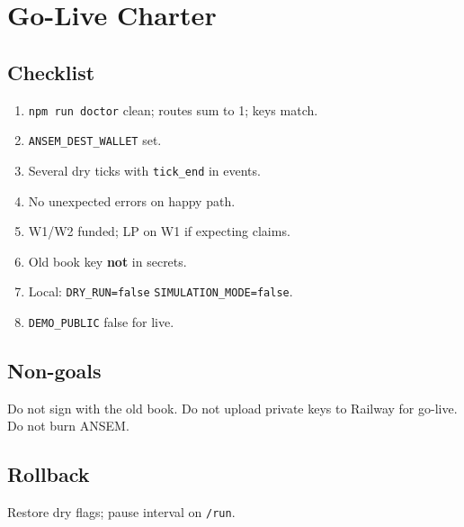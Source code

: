 \chapter{Go-Live Charter}

\section{Checklist}

\begin{enumerate}
  \item \texttt{npm run doctor} clean; routes sum to 1; keys match.
  \item \texttt{ANSEM\_DEST\_WALLET} set.
  \item Several dry ticks with \texttt{tick\_end} in events.
  \item No unexpected errors on happy path.
  \item W1/W2 funded; LP on W1 if expecting claims.
  \item Old book key \textbf{not} in secrets.
  \item Local: \texttt{DRY\_RUN=false} \texttt{SIMULATION\_MODE=false}.
  \item \texttt{DEMO\_PUBLIC} false for live.
\end{enumerate}

\section{Non-goals}

Do not sign with the old book. Do not upload private keys to Railway for go-live. Do not burn ANSEM.

\section{Rollback}

Restore dry flags; pause interval on \texttt{/run}.
